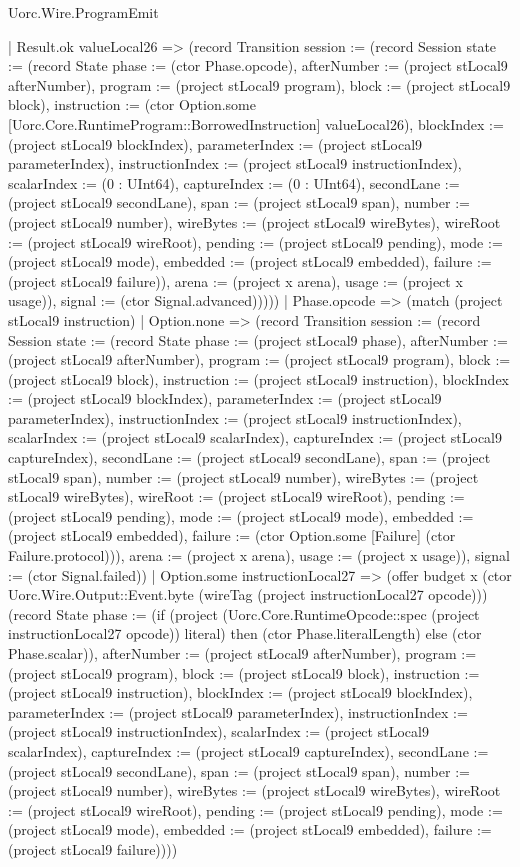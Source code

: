 \begin{lexlean}{Uorc.Wire.ProgramEmit}
\begin{semanticmodule}
{            | Result.ok valueLocal26 => (record Transition {session := (record Session {state := (record State {phase := (ctor Phase.opcode), afterNumber := (project stLocal9 afterNumber), program := (project stLocal9 program), block := (project stLocal9 block), instruction := (ctor Option.some [Uorc.Core.RuntimeProgram::BorrowedInstruction] valueLocal26), blockIndex := (project stLocal9 blockIndex), parameterIndex := (project stLocal9 parameterIndex), instructionIndex := (project stLocal9 instructionIndex), scalarIndex := (0 : UInt64), captureIndex := (0 : UInt64), secondLane := (project stLocal9 secondLane), span := (project stLocal9 span), number := (project stLocal9 number), wireBytes := (project stLocal9 wireBytes), wireRoot := (project stLocal9 wireRoot), pending := (project stLocal9 pending), mode := (project stLocal9 mode), embedded := (project stLocal9 embedded), failure := (project stLocal9 failure)}), arena := (project x arena), usage := (project x usage)}), signal := (ctor Signal.advanced)}))))
        | Phase.opcode => (match (project stLocal9 instruction)
          | Option.none => (record Transition {session := (record Session {state := (record State {phase := (project stLocal9 phase), afterNumber := (project stLocal9 afterNumber), program := (project stLocal9 program), block := (project stLocal9 block), instruction := (project stLocal9 instruction), blockIndex := (project stLocal9 blockIndex), parameterIndex := (project stLocal9 parameterIndex), instructionIndex := (project stLocal9 instructionIndex), scalarIndex := (project stLocal9 scalarIndex), captureIndex := (project stLocal9 captureIndex), secondLane := (project stLocal9 secondLane), span := (project stLocal9 span), number := (project stLocal9 number), wireBytes := (project stLocal9 wireBytes), wireRoot := (project stLocal9 wireRoot), pending := (project stLocal9 pending), mode := (project stLocal9 mode), embedded := (project stLocal9 embedded), failure := (ctor Option.some [Failure] (ctor Failure.protocol))}), arena := (project x arena), usage := (project x usage)}), signal := (ctor Signal.failed)})
          | Option.some instructionLocal27 => (offer budget x (ctor Uorc.Wire.Output::Event.byte (wireTag (project instructionLocal27 opcode))) (record State {phase := (if (project (Uorc.Core.RuntimeOpcode::spec (project instructionLocal27 opcode)) literal) then (ctor Phase.literalLength) else (ctor Phase.scalar)), afterNumber := (project stLocal9 afterNumber), program := (project stLocal9 program), block := (project stLocal9 block), instruction := (project stLocal9 instruction), blockIndex := (project stLocal9 blockIndex), parameterIndex := (project stLocal9 parameterIndex), instructionIndex := (project stLocal9 instructionIndex), scalarIndex := (project stLocal9 scalarIndex), captureIndex := (project stLocal9 captureIndex), secondLane := (project stLocal9 secondLane), span := (project stLocal9 span), number := (project stLocal9 number), wireBytes := (project stLocal9 wireBytes), wireRoot := (project stLocal9 wireRoot), pending := (project stLocal9 pending), mode := (project stLocal9 mode), embedded := (project stLocal9 embedded), failure := (project stLocal9 failure)})))
}
\end{semanticmodule}
\end{lexlean}
